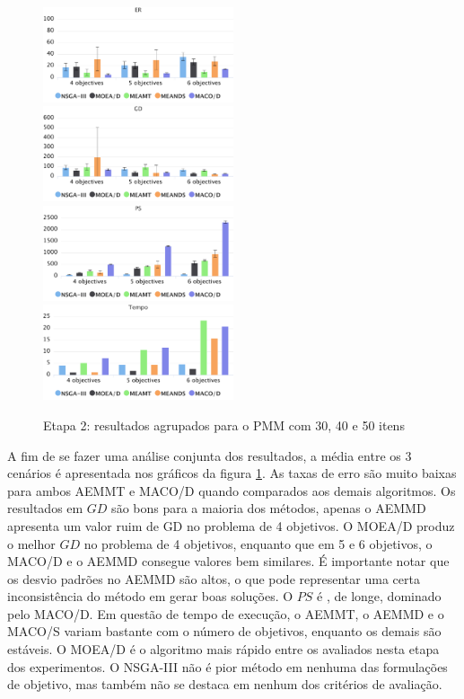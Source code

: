 \begin{figure}[!htbp]
	\caption{Etapa 2: resultados agrupados para o PMM com 30, 40 e 50 itens}
	\label{fig_exp2_mkp_todos}
	\includegraphics[width=0.5\textwidth]{cap_experimentos/figs/etapa2/er-mkp-todos}
	\includegraphics[width=0.5\textwidth]{cap_experimentos/figs/etapa2/gd-mkp-todos}
	\includegraphics[width=0.5\textwidth]{cap_experimentos/figs/etapa2/ps-mkp-todos}
	\includegraphics[width=0.5\textwidth]{cap_experimentos/figs/etapa2/time-mkp-todos}
\end{figure}

A fim de se fazer uma análise conjunta dos resultados, a média entre os 3 cenários é apresentada nos gráficos da figura \ref{fig_exp2_mkp_todos}. As taxas de erro são muito baixas para ambos AEMMT e MACO/D quando comparados aos demais algoritmos. Os resultados em $GD$ são bons para a maioria dos métodos, apenas o AEMMD apresenta um valor ruim de GD no problema de 4 objetivos. O MOEA/D produz o melhor $GD$ no problema de 4 objetivos, enquanto que em 5 e 6 objetivos, o MACO/D e o AEMMD consegue valores bem similares. É importante notar que os desvio padrões no AEMMD são altos, o que pode representar uma certa inconsistência do método em gerar boas soluções. O $PS$ é , de longe, dominado pelo MACO/D. Em questão de tempo de execução, o AEMMT, o AEMMD e o MACO/S variam bastante com o número de objetivos, enquanto os demais são estáveis. O MOEA/D é o algoritmo mais rápido entre os avaliados nesta etapa dos experimentos. O NSGA-III não é pior método em nenhuma das formulações de objetivo, mas também não se destaca em nenhum dos critérios de avaliação.

